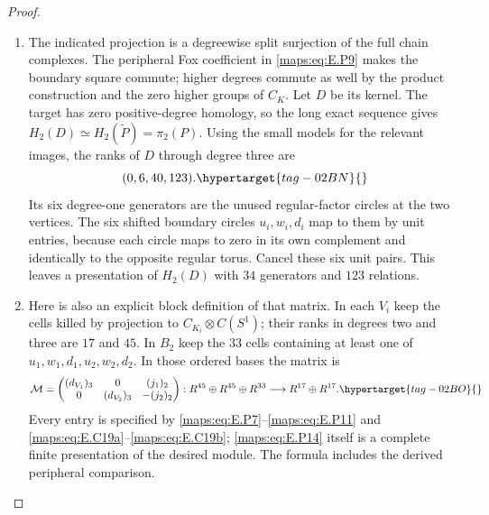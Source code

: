 \documentclass[11pt,a4paper]{article}
\numberwithin{equation}{section}
\theoremstyle{definition}
\begin{document}
\begin{proof}
\begin{enumerate}[label=\arabic*.,leftmargin=*]
\item The indicated projection is a degreewise split
surjection of the full chain complexes. The
peripheral Fox coefficient in \eqref{maps:eq:E.P9} makes the
boundary square commute; higher degrees commute
as well by the product construction and the
zero higher groups of $C_K$. Let $D$ be its kernel.
The target has zero positive-degree homology, so
the long exact sequence gives
$H_2(D)\simeq H_2(\widetilde P)=\pi_2(P)$.
Using the small models for the relevant images,
the ranks of $D$ through degree three are
\begin{equation}
                         (0,6,40,123).
 \hypertarget{tag-02BN}{}\label{maps:eq:E.P13}
\end{equation}
Its six degree-one generators are the unused
regular-factor circles at the two vertices.
The six shifted boundary circles $u_i,w_i,d_i$
map to them by unit entries, because each circle
maps to zero in its own complement and identically
to the opposite regular torus. Cancel these six
unit pairs. This leaves a presentation of $H_2(D)$
with $34$ generators and $123$ relations.

\item Here is also an explicit block definition of that
matrix. In each $V_i$ keep the cells killed by
projection to $C_{K_i}\otimes C(S^1)$; their ranks
in degrees two and three are $17$ and $45$. In $B_2$
keep the $33$ cells containing at least one of
$u_1,w_1,d_1,u_2,w_2,d_2$. In those ordered bases
the matrix is
\begin{equation}
 \mathcal M=
 \begin{pmatrix}
 (d_{V_1})_3&0&(j_1)_2\\
 0&(d_{V_2})_3&-(j_2)_2
 \end{pmatrix}:
 R^{45}\oplus R^{45}\oplus R^{33}
             \longrightarrow R^{17}\oplus R^{17}.
 \hypertarget{tag-02BO}{}\label{maps:eq:E.P14}
\end{equation}
Every entry is specified by \eqref{maps:eq:E.P7}--\eqref{maps:eq:E.P11} and
\eqref{maps:eq:E.C19a}--\eqref{maps:eq:E.C19b}; \eqref{maps:eq:E.P14} itself is a complete finite
presentation of the desired module. The formula
includes the derived peripheral comparison.



\end{enumerate}
\end{proof}
\end{document}
